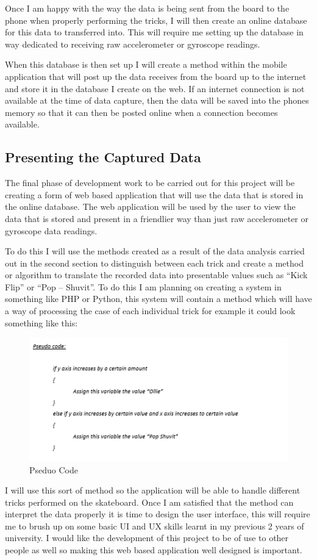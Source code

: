 Once I am happy with the way the data is being sent from the board to the phone when properly performing the tricks, I will then create an online database for this data to transferred into. This will require me setting up the database in way dedicated to receiving raw accelerometer or gyroscope readings.

When this database is then set up I will create a method within the mobile application that will post up the data receives from the board up to the internet and store it in the database I create on the web. If an internet connection is not available at the time of data capture, then the data will be saved into the phones memory so that it can then be posted online when a connection becomes available.

\subsection{Presenting the Captured Data}\label{tor:presentingdata}
The final phase of development work to be carried out for this project will be creating a form of web based application that will use the data that is stored in the online database. The web application will be used by the user to view the data that is stored and present in a friendlier way than just raw accelerometer or gyroscope data readings. 

To do this I will use the methods created as a result of the data analysis carried out in the second section to distinguish between each trick and create a method or algorithm to translate the recorded data into presentable values such as “Kick Flip” or “Pop – Shuvit”. To do this I am planning on creating a system in something like PHP or Python, this system will contain a method which will have a way of processing the case of each individual trick for example it could look something like this: 
\begin{figure}
\begin{center}
\includegraphics[width=.75\textwidth]{TOR/fig1.png}
\end{center}
\caption{Pseduo Code}
\end{figure}
I will use this sort of method so the application will be able to handle different tricks performed on the skateboard. Once I am satisfied that the method can interpret the data properly it is time to design the user interface, this will require me to brush up on some basic UI and UX skills learnt in my previous 2 years of university. I would like the development of this project to be of use to other people as well so making this web based application well designed is important.

